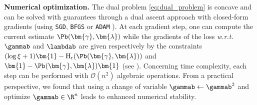 \textbf{Numerical optimization.} The dual problem \eqref{eq:dual_problem} is concave and can be solved with guarantees through a dual ascent approach with closed-form gradients (using \eg \texttt{SGD}, \texttt{BFGS} \cite{liu1989limited} or \texttt{ADAM} \cite{kingma2014adam}).
At each gradient step, one can compute the current estimate $\Pb(\bm{\gamma}, \bm{\lambda})$ while the gradients of the loss \textit{w.r.t.} $\gammab$ and $\lambdab$ are given respectively by the constraints $(\log{\xi}+1)
\bm{1} - \operatorname{H}_{\mathrm{r}}(\Pb(\bm{\gamma}, \bm{\lambda}))$ and $ \bm{1} - \Pb(\bm{\gamma}, \bm{\lambda}) \bm{1}$ (see \eg \cite[Proposition 6.1.1]{bertsekas1997nonlinear}).
Concerning time
complexity, each step can be performed with $\mathcal{O}(n^2)$ algebraic
operations. From a practical perspective, we found that using a change of variable $\gammab \leftarrow \gammab^2$ and optimize $\gammab \in \R^n$ leads to enhanced numerical stability.


